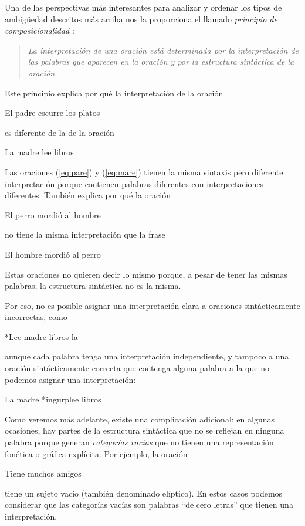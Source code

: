 Una de las perspectivas más interesantes para analizar y ordenar los tipos de ambigüedad descritos más arriba nos la proporciona el llamado \emph{principio de composicionalidad} \citep[cap.~23]{radford09b}: \begin{quote} {\sl La interpretación de una oración está determinada por la interpretación de las palabras que aparecen en la oración y por la estructura sintáctica de la oración.} \end{quote} Este principio explica por qué la interpretación de la oración \begin{exemple} \label{eq:pare} El padre escurre los platos \end{exemple} es diferente de la de la oración \begin{exemple} La madre lee libros \label{eq:mare} \end{exemple} Las oraciones (\ref{eq:pare}) y (\ref{eq:mare}) tienen la misma sintaxis pero diferente interpretación porque contienen palabras diferentes con interpretaciones diferentes. También explica por qué la oración \begin{exemple} El perro mordió al hombre \end{exemple} no tiene la misma interpretación que la frase \begin{exemple} El hombre mordió al perro \end{exemple} Estas oraciones no quieren decir lo mismo porque, a pesar de tener las mismas palabras, la estructura sintáctica no es la misma. 

Por eso, no es posible asignar una interpretación clara a oraciones sintácticamente incorrectas, como \begin{exemple} *Lee madre libros la \end{exemple} aunque cada palabra tenga una interpretación independiente, y tampoco a una oración sintácticamente correcta que contenga alguna palabra a la que no podemos asignar una interpretación: \begin{exemple} La madre *ingurplee libros \end{exemple} Como veremos más adelante, existe una complicación adicional: en algunas ocasiones, hay partes de la estructura sintáctica que no se reflejan en ninguna palabra porque generan \emph{categorías vacías} que no tienen una representación fonética o gráfica explícita. Por ejemplo, la oración \begin{exemple} Tiene muchos amigos \end{exemple} tiene un sujeto vacío (también denominado elíptico). En estos casos podemos considerar que las categorías vacías son palabras ``de cero letras'' que tienen una interpretación. 

